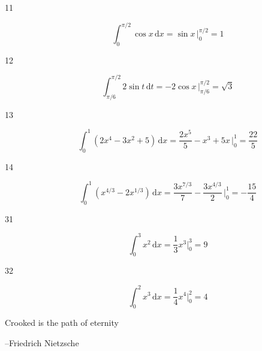\documentclass{exam}
\begin{document}
\begin{description}
\item[11]
\[
   \int_0^{\pi/2} \cos x \, \mathrm{d}x = \sin x \, \bigg|_0^{\pi/2} = 1
\]

\item[12]
\[
   \int_{\pi/6}^{\pi/2} 2 \sin t \, \mathrm{d}t = -2 \cos x \, \bigg|_{\pi/6}^{\pi/2} = \sqrt{3}
\]

\item[13]
\[
   \int_0^1 \left( 2x^4 - 3x^2 + 5 \right) \, \mathrm{d}x = \frac{2x^5}{5} - x^3 + 5x \, \bigg|_0^1 = \frac{22}{5}
\]

\item[14]
\[
   \int_0^1 \left( x^{4/3} - 2x^{1/3} \right) \, \mathrm{d}x = \frac{3x^{7/3}}{7} - \frac{3x^{4/3}}{2}\, \bigg|_0^1 = - \frac{15}{4}
\]

\item[31]
\[
   \int_0^3 x^2 \, \mathrm{d}x = \frac{1}{3} x^3 \bigg|_0^3 = 9
\]

\item[32]
\[
   \int_0^2 x^3 \, \mathrm{d}x = \frac{1}{4} x^4 \bigg|_0^2 = 4
\]



\end{description}

\else


{Crooked is the path of eternity}
\vspace{.2 cm}

\hspace{0.5 cm} --Friedrich Nietzsche





\fi
\end{document}
